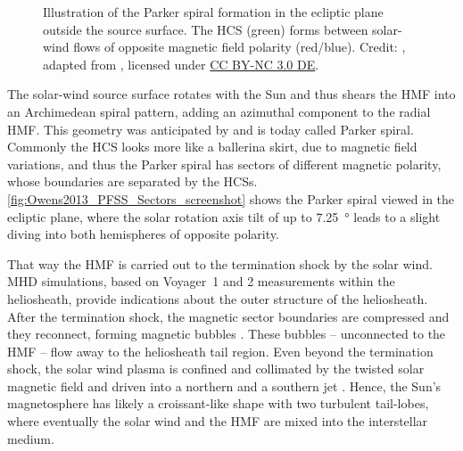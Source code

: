 \begin{figure}[htb]
\begin{floatrow}
{		}{
			\caption{Illustration of the Parker spiral formation in the ecliptic plane outside the source surface. The HCS (green) forms between solar-wind flows of opposite magnetic field polarity (red/blue). Credit: \citet[Fig.~1]{Owens2013}, adapted from \citet[Fig.~1]{Schatten1969}, licensed under \href{https://creativecommons.org/licenses/by-nc/3.0/de/}{CC BY-NC 3.0 DE}.}
			\label{fig:Owens2013_PFSS_Sectors_screenshot}
		}
	\end{floatrow}
\end{figure}

The solar-wind source surface rotates with the Sun and thus shears the HMF into an Archimedean spiral pattern, adding an azimuthal component to the radial HMF. This geometry was anticipated by \citet{Parker1958} and is today called Parker spiral. Commonly the HCS looks more like a ballerina skirt, due to magnetic field variations, and thus the Parker spiral has sectors of different magnetic polarity, whose boundaries are separated by the HCSs. \autoref{fig:Owens2013_PFSS_Sectors_screenshot} shows the Parker spiral viewed in the ecliptic plane, where the solar rotation axis tilt of up to \SI{7.25}{\degree} leads to a slight diving into both hemispheres of opposite polarity.

That way the HMF is carried out to the termination shock by the solar wind. MHD simulations, based on Voyager~1 and 2 measurements within the heliosheath, provide indications about the outer structure of the heliosheath. After the termination shock, the magnetic sector boundaries are compressed and they reconnect, forming magnetic bubbles \citep{Opher2011}. These bubbles -- unconnected to the HMF -- flow away to the heliosheath tail region. Even beyond the termination shock, the solar wind plasma is confined and collimated by the twisted solar magnetic field and driven into a northern and a southern jet \citep{Opher2015}. Hence, the Sun's magnetosphere has likely a croissant-like shape with two turbulent tail-lobes, where eventually the solar wind and the HMF are mixed into the interstellar medium.


